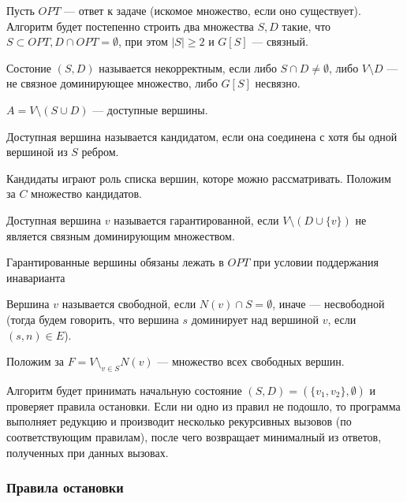 Пусть \(OPT\) --- ответ к задаче (искомое множество, если оно существует). Алгоритм будет постепенно строить два множества \(S, D\) такие, что \(S \subset OPT, D \cap OPT = \emptyset\), при этом \(|S| \ge 2\) и \(G[S]\) --- связный.

\begin{definition}
    Состоние \((S, D)\) называется некорректным, если либо \(S \cap D \ne \emptyset\), либо \(V \setminus D\) --- не связное доминирующее множество, либо \(G[S]\) несвязно.
\end{definition}

\begin{definition}
    \(A = V \setminus (S \cup D)\) --- доступные вершины.
\end{definition}

\begin{definition}
    Доступная вершина называется кандидатом, если она соединена с хотя бы одной вершиной из \(S\) ребром.
\end{definition}

Кандидаты играют роль списка вершин, которе можно рассматривать. Положим за \(C\) множество кандидатов.

\begin{definition}
    Доступная вершина \(v\) называется гарантированной, если \(V \setminus (D \cup \{v\})\) не является связным доминирующим множеством.
\end{definition}

Гарантированные вершины обязаны лежать в \(OPT\) при условии поддержания инаварианта

\begin{definition}
    Вершина \(v\) называется свободной, если \(N(v) \cap S = \emptyset\), иначе --- несвободной (тогда будем говорить, что вершина \(s\) доминирует над вершиной \(v\), если \((s, n) \in E\)).
\end{definition}

Положим за \(F = V \setminus_{v \in S} N(v)\) --- множество всех свободных вершин.

Алгоритм будет принимать начальную состояние \((S, D) = (\{v_1, v_2\}, \emptyset)\) и проверяет правила остановки. Если ни одно из правил не подошло, то программа выполняет редукцию и производит несколько рекурсивных вызовов (по соответствующим правилам), после чего возвращает минималный из ответов, полученных при данных вызовах.

\subsubsection{Правила остановки}

